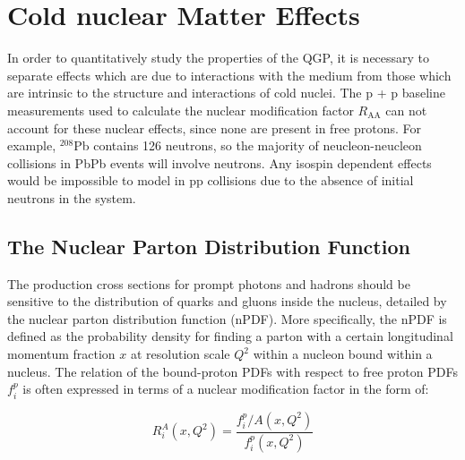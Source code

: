 \section{Cold nuclear Matter Effects}
In order to quantitatively study the properties of the QGP, it is necessary to separate effects which are due to interactions with the medium from those which are intrinsic to the structure and interactions of cold nuclei. The p + p baseline measurements used to calculate the nuclear modification factor $R_\mathrm{AA}$ can not account for these nuclear effects, since none are present in free protons. For example, $^{208}$Pb contains 126 neutrons, so the majority of neucleon-neucleon collisions in PbPb events will involve neutrons. Any isospin dependent effects would be impossible to model in pp collisions due to the absence of initial neutrons in the system.

\subsection{The Nuclear Parton Distribution Function}
The production cross sections for prompt photons and hadrons should be sensitive to the distribution of quarks and gluons inside the nucleus, detailed by the nuclear parton distribution function (nPDF). More specifically, the nPDF is defined as the probability density for finding a parton with a certain longitudinal momentum fraction $x$ at resolution scale $Q^2$ within a nucleon bound within a nucleus. The relation of the bound-proton PDFs with respect to free proton PDFs $f_i^p$ is often expressed in terms of a nuclear modification factor in the form of:

\begin{equation}
  R_i^A(x,Q^2) = \frac{f_i^p/A(x,Q^2)}{f_i^p(x,Q^2)} 
\end{equation}

